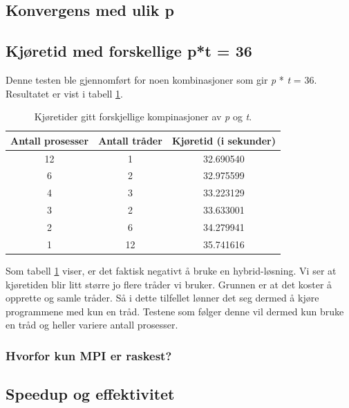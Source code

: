 \documentclass{article}
\begin{document}
\subsection{Konvergens med ulik p}

\subsection{Kjøretid med forskellige p*t = 36}
Denne testen ble gjennomført for noen kombinasjoner som gir \emph{p} * \emph{t} = 36. Resultatet er vist i tabell \ref{p/t-table}.

\begin{table}
\begin{center}
	
	\begin{tabular}{c | c | c}
	\hline \hline 
	Antall prosesser      &    Antall tråder     &    Kjøretid (i sekunder) 	    \\ \hline	
	12		      &		1	     &	  32.690540       		    \\ \hline
	6		      &         2	     &    32.975599       		    \\ \hline
	4		      &         3	     &    33.223129	    		    \\ \hline
	3   		      &		2	     &    33.633001	    		    \\ \hline
	2		      &         6	     &    34.279941	    		    \\ \hline
	1		      &		12	     &    35.741616	    		    \\ \hline
	
	\end{tabular}
\end{center}
\caption{Kjøretider gitt forskjellige kompinasjoner av \emph{p} og \emph{t}.}
\label{p/t-table}
\end{table}

Som tabell \ref{p/t-table} viser, er det faktisk negativt å bruke en hybrid-løsning. Vi ser at kjøretiden blir litt større jo flere tråder vi bruker. Grunnen er at det koster å opprette og samle tråder. Så i dette tilfellet lønner det seg dermed å kjøre programmene med kun en tråd. 
Testene som følger denne vil dermed kun bruke en tråd og heller variere antall prosesser. 

\subsubsection{Hvorfor kun MPI er raskest?}

\subsection{Speedup og effektivitet}
\end{document}
